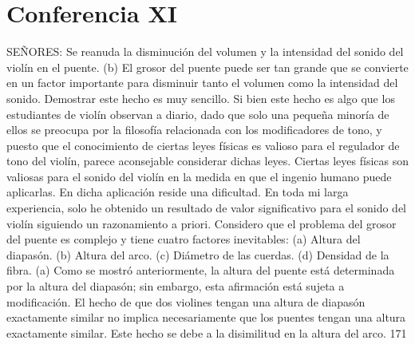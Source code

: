 \chapter*{Conferencia XI}
SEÑORES: Se reanuda la disminución del volumen y la intensidad del sonido del violín en el puente.
(b) El grosor del puente puede ser tan grande que se convierte en un factor importante para disminuir tanto el volumen como la intensidad del sonido. Demostrar este hecho es muy sencillo. Si bien este hecho es algo que los estudiantes de violín observan a diario, dado que solo una pequeña minoría de ellos se preocupa por la filosofía relacionada con los modificadores de tono, y puesto que el conocimiento de ciertas leyes físicas es valioso para el regulador de tono del violín, parece aconsejable considerar dichas leyes. Ciertas leyes físicas son valiosas para el sonido del violín en la medida en que el ingenio humano puede aplicarlas. En dicha aplicación reside una dificultad. En toda mi larga experiencia, solo he obtenido un resultado de valor significativo para el sonido del violín siguiendo un razonamiento a priori.
Considero que el problema del grosor del puente es complejo y tiene cuatro factores inevitables:
(a) Altura del diapasón. (b) Altura del arco. (c) Diámetro de las cuerdas. (d) Densidad de la fibra.
(a) Como se mostró anteriormente, la altura del puente está determinada por la altura del diapasón; sin embargo, esta afirmación está sujeta a modificación. El hecho de que dos violines tengan una altura de diapasón exactamente similar no implica necesariamente que los puentes tengan una altura exactamente similar. Este hecho se debe a la disimilitud en la altura del arco.
171

